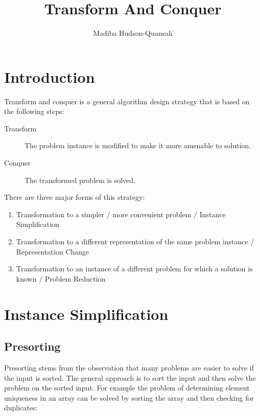 \documentclass[12pt letter]{report}
\title{\Huge{Transform And Conquer}}
\author{\huge{Madiba Hudson-Quansah}}
\date{}
\begin{document}
\maketitle
\newpage
{}
\tableofcontents
\pagebreak

\chapter{Introduction}

Transform and conquer is a general algorithm design strategy that is based on the following steps:
\begin{description}
  \item[Transform] The problem instance is modified to make it more amenable to solution.
  \item[Conquer] The transformed problem is solved.
\end{description}

There are three major forms of this strategy:
\begin{enumerate}
  \item Transformation to a simpler / more convenient problem / Instance Simplification
  \item Transformation to a different representation of the same problem instance / Representation Change
  \item Transformation to an instance of a different problem for which a solution is known / Problem Reduction
\end{enumerate}

\chapter{Instance Simplification}

\section{Presorting}

Presorting stems from the observation that many problems are easier to solve if the input is sorted. The general
approach is to sort the input and then solve the problem on the sorted input. For example the problem of determining
element uniqueness in an array can be solved by sorting the array and then checking for duplicates:
\end{document}
